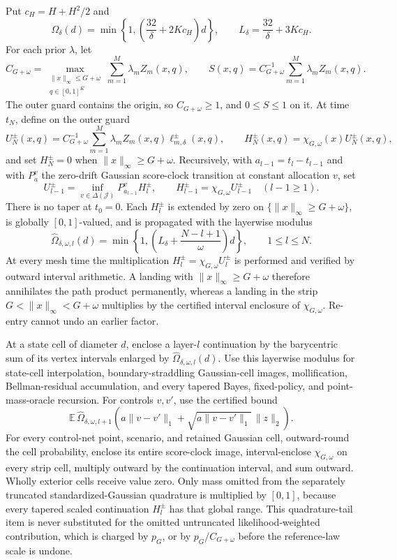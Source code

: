 Put \(c_H=H+H^2/2\) and
\[
 \Omega_\delta(d)=\min\!\left\{1,\left(\frac{32}{\delta}+2Kc_H\right)d\right\},
 \qquad
 L_\delta=\frac{32}{\delta}+3Kc_H.
\]
For each prior \(\lambda\), let
\[
 C_{G+\omega}=\max_{\substack{\|x\|_\infty\leq G+\omega\\q\in[0,1]^K}}
 \sum_{m=1}^M\lambda_mZ_m(x,q),
 \qquad
 S(x,q)=C_{G+\omega}^{-1}\sum_{m=1}^M\lambda_mZ_m(x,q).
\]
The outer guard contains the origin, so \(C_{G+\omega}\geq1\), and \(0\leq S\leq1\) on it.  At time \(t_N\), define on the outer guard
\[
 U_N^\pm(x,q)=C_{G+\omega}^{-1}\sum_{m=1}^M
 \lambda_mZ_m(x,q)\ell_{m,\delta}^{\pm}(x,q),
 \qquad H_N^\pm(x,q)=\chi_{G,\omega}(x)U_N^\pm(x,q),
\]
and set \(H_N^\pm=0\) when \(\|x\|_\infty\geq G+\omega\).  Recursively, with \(a_{l-1}=t_l-t_{l-1}\) and with \(P_a^v\) the zero-drift Gaussian score-clock transition at constant allocation \(v\), set
\[
 U_{l-1}^\pm=\inf_{v\in\Delta(\mathcal J)}P_{a_{l-1}}^vH_l^\pm,
 \qquad
 H_{l-1}^\pm=\chi_{G,\omega}U_{l-1}^\pm\quad(l-1\geq1).
\]
There is no taper at \(t_0=0\).  Each \(H_l^\pm\) is extended by zero on \(\{\|x\|_\infty\geq G+\omega\}\), is globally \([0,1]\)-valued, and is propagated with the layerwise modulus
\[
 \widehat\Omega_{\delta,\omega,l}(d)
 =\min\!\left\{1,\left(L_\delta+\frac{N-l+1}{\omega}\right)d\right\},
 \qquad 1\leq l\leq N.
\]
At every mesh time the multiplication \(H_l^\pm=\chi_{G,\omega}U_l^\pm\) is performed and verified by outward interval arithmetic.  A landing with \(\|x\|_\infty\geq G+\omega\) therefore annihilates the path product permanently, whereas a landing in the strip \(G<\|x\|_\infty<G+\omega\) multiplies by the certified interval enclosure of \(\chi_{G,\omega}\).  Re-entry cannot undo an earlier factor.

At a state cell of diameter \(d\), enclose a layer-\(l\) continuation by the barycentric sum of its vertex intervals enlarged by \(\widehat\Omega_{\delta,\omega,l}(d)\).  Use this layerwise modulus for state-cell interpolation, boundary-straddling Gaussian-cell images, mollification, Bellman-residual accumulation, and every tapered Bayes, fixed-policy, and point-mass-oracle recursion.  For controls \(v,v'\), use the certified bound
\[
 \mathbb E\,\widehat\Omega_{\delta,\omega,l+1}\!\left(
 a\|v-v'\|_1+\sqrt{a\|v-v'\|_1}\,\|z\|_2\right).
\]
For every control-net point, scenario, and retained Gaussian cell, outward-round the cell probability, enclose its entire score-clock image, interval-enclose \(\chi_{G,\omega}\) on every strip cell, multiply outward by the continuation interval, and sum outward.  Wholly exterior cells receive value zero.  Only mass omitted from the separately truncated standardized-Gaussian quadrature is multiplied by \([0,1]\), because every tapered scaled continuation \(H_l^\pm\) has that global range.  This quadrature-tail item is never substituted for the omitted untruncated likelihood-weighted contribution, which is charged by \(p_G\), or by \(p_G/C_{G+\omega}\) before the reference-law scale is undone.

